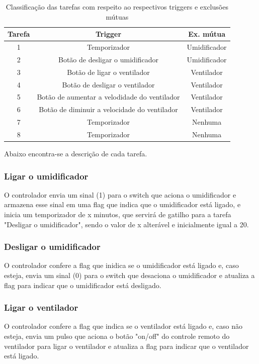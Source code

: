 \documentclass[conference]{IEEEtran}
\begin{document}
\begin{table}[H]
	\centering
	\begin{tabular}{|c|c|c|}
		\hline
		Tarefa & Trigger & Ex. mútua \\
		\hline
		1 & Temporizador& Umidificador\\
		\hline
		2 & Botão de desligar o umidificador& Umidificador\\
		\hline
		3 & Botão de ligar o ventilador& Ventilador\\
		\hline
		4 & Botão de desligar o ventilador& Ventilador\\
		\hline
		5 & Botão de aumentar a velodidade do ventilador& Ventilador\\
		\hline
		6 & Botão de diminuir a velocidade do ventilador& Ventilador\\
		\hline
		7 & Temporizador& Nenhuma\\
		\hline
		8 & Temporizador& Nenhuma\\
		\hline
	\end{tabular}
	\caption{Classificação das tarefas com respeito ao respectivos triggers e exclusões mútuas}
	\label{tab:tarefas2}
\end{table}

Abaixo encontra-se a descrição de cada tarefa.

\subsubsection{Ligar o umidificador}
O controlador envia um sinal (1) para o switch que aciona o umidificador e armazena esse sinal em uma flag que indica que o umidificador está ligado, e inicia um temporizador de x minutos, que servirá de gatilho para a tarefa "Desligar o umidificador", sendo o valor de x alterável e inicialmente igual a 20.

\subsubsection{Desligar o umidificador}
O controlador confere a flag que inidica se o umidificador está ligado e, caso esteja, envia um sinal (0) para o switch que desaciona o umidificador e atualiza a flag para indicar que o umidificador está desligado.

\subsubsection{Ligar o ventilador}
O controlador confere a flag que indica se o ventilador está ligado e, caso não esteja, envia um pulso que aciona o botão "on/off" do controle remoto do ventilador para ligar o ventilador e atualiza a flag para indicar que o ventilador está ligado. 
\end{document}
